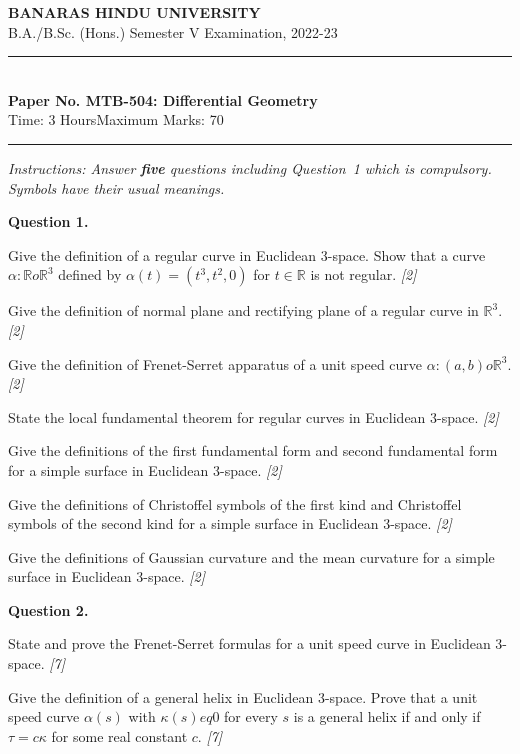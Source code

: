 \documentclass[11pt,a4paper]{article}
\newcommand{\pts}[1]{\hfill   \textit{[#1]}}
\begin{document}
\begin{center}
  {\large\bfseries BANARAS HINDU UNIVERSITY}\\[2pt]
  {\normalsize B.A./B.Sc. (Hons.) Semester V Examination, 2022-23}\\[6pt]
  \rule{0.8\linewidth}{0.5pt}\\[6pt]
  {\large\bfseries Paper No. MTB-504: Differential Geometry}\\[4pt]
  {\normalsize Time: 3 Hours\hfill Maximum Marks: 70}
\end{center}

\rule{\linewidth}{0.4pt}

\smallskip



\noindent   \textit{Instructions: Answer   \textbf{five} questions including Question~1 which is compulsory. Symbols have their usual meanings.}

\medskip


\noindent   \textbf{Question 1.}

\begin{parts}
  \item Give the definition of a regular curve in Euclidean 3-space. Show that a curve $\alpha : \mathbb{R}  o \mathbb{R}^3$ defined by $\alpha(t) = (t^3, t^2, 0)$ for $t \in \mathbb{R}$ is not regular. \pts{2}
  \item Give the definition of normal plane and rectifying plane of a regular curve in $\mathbb{R}^3$. \pts{2}
  \item Give the definition of Frenet-Serret apparatus of a unit speed curve $\alpha : (a,b)  o \mathbb{R}^3$. \pts{2}
  \item State the local fundamental theorem for regular curves in Euclidean 3-space. \pts{2}
  \item Give the definitions of the first fundamental form and second fundamental form for a simple surface in Euclidean 3-space. \pts{2}
  \item Give the definitions of Christoffel symbols of the first kind and Christoffel symbols of the second kind for a simple surface in Euclidean 3-space. \pts{2}
  \item Give the definitions of Gaussian curvature and the mean curvature for a simple surface in Euclidean 3-space. \pts{2}
\end{parts}

\medskip


\noindent   \textbf{Question 2.}

\begin{parts}
  \item State and prove the Frenet-Serret formulas for a unit speed curve in Euclidean 3-space. \pts{7}
  \item Give the definition of a general helix in Euclidean 3-space. Prove that a unit speed curve $\alpha(s)$ with $\kappa(s) 
eq 0$ for every $s$ is a general helix if and only if $ \tau = c \kappa$ for some real constant $c$. \pts{7}
\end{parts}
\end{document}
